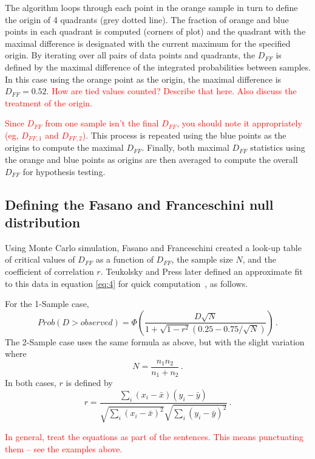 \documentclass[codesnippet]{jss}
\newcommand{\RBnote}[1]{\textcolor{red}{#1}}
\begin{document}
The algorithm loops through each point in the orange sample in turn to define the origin of 4 quadrants (grey dotted line). The fraction of orange and blue points in each quadrant is computed (corners of plot) and the quadrant with the maximal difference is designated with the current maximum for the specified origin. By iterating over all pairs of data points and quadrants, the $D_{FF}$ is defined by the maximal difference of the integrated probabilities between samples. In this case using the orange point as the origin, the maximal difference is $D_{FF} = 0.52$.
\RBnote{How are tied values counted? Describe that here.  Also discuss the treatment of the origin.}

\RBnote{Since $D_{FF}$ from one sample isn't the final $D_{FF}$, you should note it appropriately (eg, $D_{FF,1}$ and $D_{FF,2}$).}
This process is repeated using the blue points as the origins to compute the maximal $D_{FF}$. Finally, both maximal $D_{FF}$ statistics using the orange and blue points as origins are then averaged to compute the overall $D_{FF}$ for hypothesis testing.

\subsection{Defining the Fasano and Franceschini null distribution}

Using Monte Carlo simulation, Fasano and Franceschini created a look-up table of critical values of $D_{FF}$ as a function of $D_{FF}$, the sample size $N$, and the coefficient of correlation $r$. Teukolsky and Press later defined an approximate fit to this data in equation \ref{eq:4} for quick computation~\cite{numericalRecipes}, as follows.

For the 1-Sample case,
\begin{equation} \label{eq:4}
Prob(D > observed) = \Phi ( \frac{D\sqrt{N}}{1+\sqrt{1-r^2}(0.25-0.75/\sqrt{N})}) \, .
\end{equation}
The 2-Sample case uses the same formula as above, but with the slight variation where
\begin{equation} \label{eq:5}
N = \frac{n_1n_2}{n_1+n_2}\, .
\end{equation}
In both cases, $r$ is defined by
\begin{equation} \label{eq:6}
r = \frac{\sum_{i}^{}(x_i-\bar{x})(y_i-\bar{y})}{\sqrt{\sum_{i}^{}(x_i-\bar{x})^2}\sqrt{\sum_{i}^{}(y_i-\bar{y})^2}}\, .
\end{equation}

\RBnote{In general, treat the equations as part of the sentences.  This means punctuating them -- see the examples above.}
\end{document}
